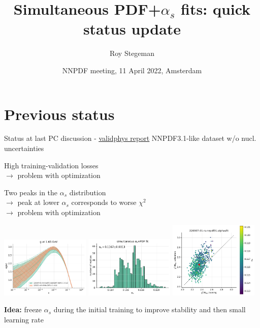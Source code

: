 \documentclass[aspectratio=169,10pt]{beamer}
\title{Simultaneous PDF+$\alpha_s$ fits: quick status update}
\date{NNPDF meeting, 11 April 2022, Amsterdam}
\author{Roy Stegeman}
\institute{University of Milan and INFN Milan}
\begin{document}
{
\begin{frame}
  \titlepage
\end{frame}
}




\section*{Previous status}

\begin{frame}[t]{Status at last PC discussion - \underline{\href{https://vp.nnpdf.science/AkI8zEchR4qU5tn7zxUZ0g==/}{validphys report}}}
  NNPDF3.1-like dataset w/o nucl. uncertainties\\\vspace*{0.5em}

  High training-validation losses\\
  $\rightarrow$ problem with optimization\\\vspace*{0.5em}

  Two peaks in the $\alpha_s$ distribution \\
  $\rightarrow$ peak at lower $\alpha_s$ corresponds to worse $\chi^2$ \\
  $\rightarrow$ problem with optimization

  \vspace*{-8mm}
  \includegraphics[width=0.32\textwidth]{PDFnormalize0_Basespecs0_PDFscalespecs0_plot_pdfs_g_prev.pdf}
  \includegraphics[width=0.32\textwidth]{alphas_hist_prev.pdf}
  \includegraphics[width=0.32\textwidth]{plot_training_validation_prev.pdf}

  \textbf{Idea:} freeze $\alpha_s$ during the initial training to improve stability and then small learning rate

\end{frame}
\end{document}
